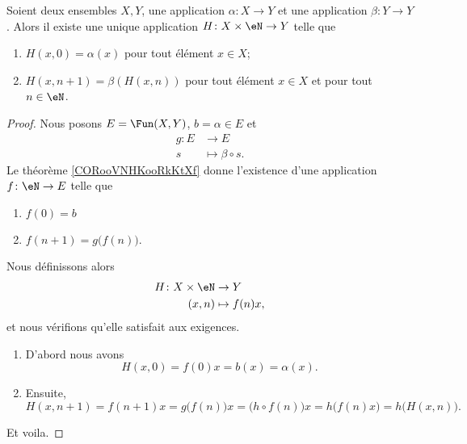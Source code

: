  
\begin{corollary}       \label{CORooVNHKooRkKtXf}
    Soient deux ensembles \( X,Y\), une application \( \alpha\colon X\to Y\) et une application \( \beta\colon Y\to Y\). Alors il existe une unique application \( H\colon X\times \eN\to Y\) telle que
\begin{enumerate}
    \item
  $H(x , 0) = \alpha(x)$   pour tout élément $x\in X$;
  \item
 $H(x , n+1 ) = \beta( H( x , n) )$ pour tout élément \( x\in X\) et pour tout \( n\in \eN\).
\end{enumerate}
\end{corollary}

\begin{proof}
    Nous posons \( E=\Fun(X,Y)\), \( b=\alpha\in E\) et
    \begin{equation}
        \begin{aligned}
            g\colon E&\to E \\
            s&\mapsto \beta\circ s. 
        \end{aligned}
    \end{equation}
    Le théorème \ref{CORooVNHKooRkKtXf} donne l'existence d'une application \( f\colon \eN\to E\) telle que
    \begin{enumerate}
        \item
            \( f(0)=b\)
        \item
            \( f(n+1)=g\big( f(n) \big)\).
    \end{enumerate}
    Nous définissons alors
    \begin{equation}
        \begin{aligned}
            H\colon X\times \eN&\to Y \\
            (x,n)&\mapsto f(n)x, 
        \end{aligned}
    \end{equation}
    et nous vérifions qu'elle satisfait aux exigences.

    \begin{enumerate}
        \item
            D'abord nous avons
            \begin{equation}
                H(x,0)=f(0)x=b(x)=\alpha(x).
            \end{equation}
        \item
            Ensuite,
            \begin{equation}
                H(x,n+1)=f(n+1)x=g\big( f(n) \big)x=\big( h\circ f(n) \big)x=h\big( f(n)x \big)=h\big( H(x,n) \big).
            \end{equation}
    \end{enumerate}
    Et voila.
\end{proof}

